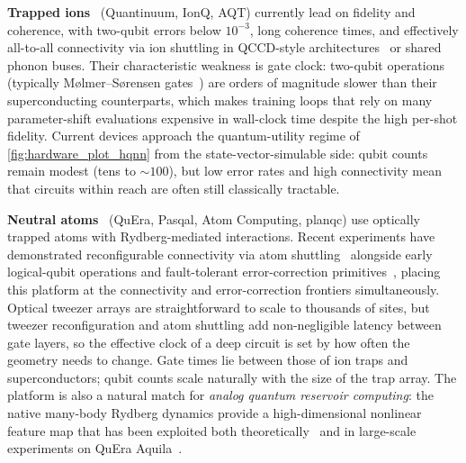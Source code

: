 \documentclass[aps,10pt,groupedaddress,prx,superscriptaddress,twocolumn,balancelastpage, tightenlines]{revtex4-2}
\theoremstyle{plain}  %
\begin{document}
\textbf{Trapped ions}~\cite{decross2024computational} (Quantinuum, IonQ, AQT) currently lead on fidelity and coherence, with two-qubit errors below $10^{-3}$, long coherence times, and effectively all-to-all connectivity via ion shuttling in QCCD-style architectures~\cite{kielpinski_architecture_2002,pino_qccd_2021} or shared phonon buses. Their characteristic weakness is gate clock: two-qubit operations (typically M{\o}lmer--S{\o}rensen gates~\cite{sorensen_molmer_2000}) are orders of magnitude slower than their superconducting counterparts, which makes training loops that rely on many parameter-shift evaluations expensive in wall-clock time despite the high per-shot fidelity. Current devices approach the quantum-utility regime of \autoref{fig:hardware_plot_hqnn} from the state-vector-simulable side: qubit counts remain modest (tens to $\sim\!100$), but low error rates and high connectivity mean that circuits within reach are often still classically tractable.

\textbf{Neutral atoms}~\cite{balewski2024engineering, bluvstein2024logical} (QuEra, Pasqal, Atom Computing, planqc) use optically trapped atoms with Rydberg-mediated interactions. Recent experiments have demonstrated reconfigurable connectivity via atom shuttling~\cite{bluvstein2024logical} alongside early logical-qubit operations and fault-tolerant error-correction primitives~\cite{bluvstein2024logical}, placing this platform at the connectivity and error-correction frontiers simultaneously. Optical tweezer arrays are straightforward to scale to thousands of sites, but tweezer reconfiguration and atom shuttling add non-negligible latency between gate layers, so the effective clock of a deep circuit is set by how often the geometry needs to change. Gate times lie between those of ion traps and superconductors; qubit counts scale naturally with the size of the trap array. The platform is also a natural match for \emph{analog quantum reservoir computing}: the native many-body Rydberg dynamics provide a high-dimensional nonlinear feature map that has been exploited both theoretically~\cite{bravo_quantum_2022} and in large-scale experiments on QuEra Aquila~\cite{kornjavca2024large}.
\end{document}
